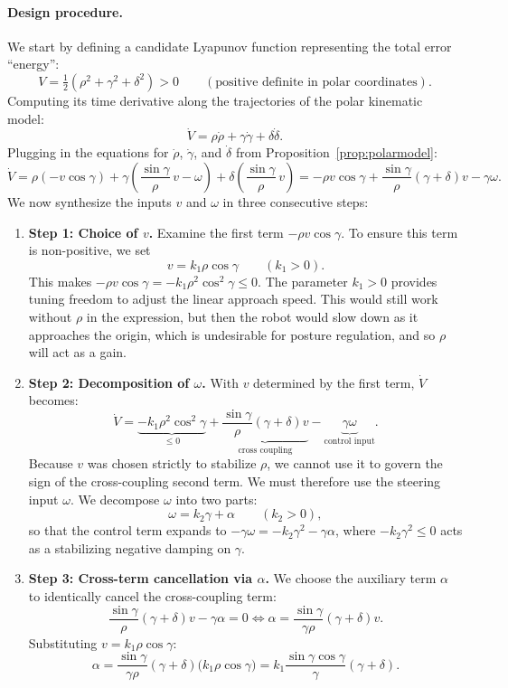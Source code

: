 \documentclass[11pt,a4paper]{article}
\theoremstyle{plain}
\theoremstyle{definition}
\theoremstyle{remark}
\begin{document}
\paragraph{Design procedure.}
We start by defining a candidate Lyapunov function representing the total error ``energy'':
\[
V = \tfrac{1}{2}\left(\rho^2 + \gamma^2 + \delta^2\right) > 0\qquad (\text{positive definite in polar coordinates}).
\]
Computing its time derivative along the trajectories of the polar kinematic model:
\[
\dot V = \rho\dot\rho + \gamma\dot\gamma + \delta\dot\delta .
\]
Plugging in the equations for $\dot\rho$, $\dot\gamma$, and $\dot\delta$ from Proposition~\ref{prop:polarmodel}:
\[
\dot V = \rho(-v\cos\gamma) + \gamma\left(\frac{\sin\gamma}{\rho}\,v - \omega\right) + \delta\left(\frac{\sin\gamma}{\rho}\,v\right)
= -\rho v\cos\gamma + \frac{\sin\gamma}{\rho}(\gamma+\delta)v - \gamma\omega .
\]
We now synthesize the inputs $v$ and $\omega$ in three consecutive steps:
\begin{enumerate}[leftmargin=*]
\item \textbf{Step 1: Choice of $v$.}
Examine the first term $-\rho v\cos\gamma$. To ensure this term is non-positive, we set
\[
v = k_1\rho\cos\gamma\qquad (k_1>0).
\]
This makes $-\rho v\cos\gamma = -k_1\rho^2\cos^2\gamma \le 0$. The parameter $k_1>0$ provides tuning freedom to adjust the linear approach speed. This would still work without $\rho$ in the expression, but then the robot would slow down as it approaches the origin, which is undesirable for posture regulation, and so $\rho$ will act as a gain.

\item \textbf{Step 2: Decomposition of $\omega$.}
With $v$ determined by the first term, $\dot V$ becomes:
\[
\dot V = \underbrace{-k_1\rho^2\cos^2\gamma}_{\le 0} + \underbrace{\frac{\sin\gamma}{\rho}(\gamma+\delta)v}_{\text{cross coupling}} - \underbrace{\gamma\omega}_{\text{control input}} .
\]
Because $v$ was chosen strictly to stabilize $\rho$, we cannot use it to govern the sign of the cross-coupling second term. We must therefore use the steering input $\omega$.
We decompose $\omega$ into two parts:
\[
\omega = k_2\gamma + \alpha\qquad (k_2>0),
\]
so that the control term expands to $-\gamma\omega = -k_2\gamma^2 - \gamma\alpha$, where $-k_2\gamma^2 \le 0$ acts as a stabilizing negative damping on $\gamma$.

\item \textbf{Step 3: Cross-term cancellation via $\alpha$.}
We choose the auxiliary term $\alpha$ to identically cancel the cross-coupling term:
\[
\frac{\sin\gamma}{\rho}(\gamma+\delta)v - \gamma\alpha = 0 \iff \alpha = \frac{\sin\gamma}{\gamma\rho}(\gamma+\delta)v .
\]
Substituting $v = k_1\rho\cos\gamma$:
\[
\alpha = \frac{\sin\gamma}{\gamma\rho}(\gamma+\delta)\bigl(k_1\rho\cos\gamma\bigr) = k_1\frac{\sin\gamma\cos\gamma}{\gamma}(\gamma+\delta).
\]
\end{enumerate}
\end{document}
